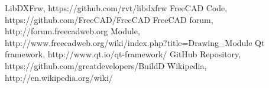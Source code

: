\begin{thebibliography}{9}
\bibitem{} LibDXFrw, https://github.com/rvt/libdxfrw
\bibitem{} FreeCAD Code, https://github.com/FreeCAD/FreeCAD
\bibitem{} FreeCAD forum, http://forum.freecadweb.org
\bibitem{} Module, http://www.freecadweb.org/wiki/index.php?title=Drawing\_Module
\bibitem{} Qt framework, http://www.qt.io/qt-framework/
\bibitem{} GitHub Repository, https://github.com/greatdevelopers/BuildD
\bibitem{} Wikipedia, http://en.wikipedia.org/wiki/
\end{thebibliography}
